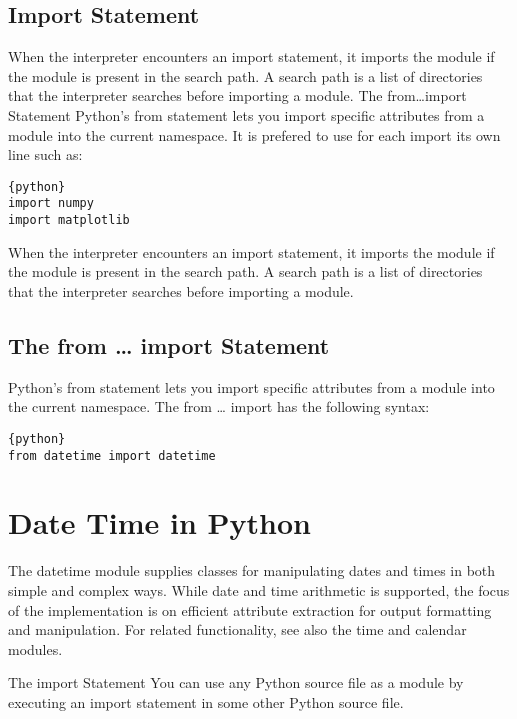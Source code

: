 \subsection{Import Statement}\label{import-statement}

When the interpreter encounters an import statement, it imports the
module if the module is present in the search path. A search path is a
list of directories that the interpreter searches before importing a
module. The from\ldots{}import Statement Python's from statement lets
you import specific attributes from a module into the current namespace.
It is prefered to use for each import its own line such as:

\begin{lstlisting}{python}
import numpy
import matplotlib
\end{lstlisting}

When the interpreter encounters an import statement, it imports the
module if the module is present in the search path. A search path is a
list of directories that the interpreter searches before importing a
module.

\subsection{The from \ldots{} import
Statement}\label{the-from-import-statement}

Python's from statement lets you import specific attributes from a
module into the current namespace. The from \ldots{} import has the
following syntax:

\begin{lstlisting}{python}
from datetime import datetime   
\end{lstlisting}

\section{Date Time in Python}\label{date-time-in-python}

The datetime module supplies classes for manipulating dates and times in
both simple and complex ways. While date and time arithmetic is
supported, the focus of the implementation is on efficient attribute
extraction for output formatting and manipulation. For related
functionality, see also the time and calendar modules.

The import Statement You can use any Python source file as a module by
executing an import statement in some other Python source file.

